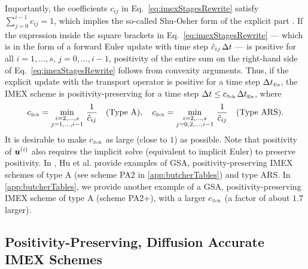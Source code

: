 Importantly, the coefficients $c_{ij}$ in Eq.~\eqref{eq:imexStagesRewrite} satisfy $\sum_{j=0}^{i-1}c_{ij}=1$, which implies the so-called Shu-Osher form of the explicit part \cite{shuOsher_1988}.  
If the expression inside the square brackets in Eq.~\eqref{eq:imexStagesRewrite} --- which is in the form of a forward Euler update with time step $\hat{c}_{ij}\,\Delta t$ --- is positive for all $i=1,\ldots,s$, $j=0,\ldots,i-1$, positivity of the entire sum on the right-hand side of Eq.~\eqref{eq:imexStagesRewrite} follows from convexity arguments.  
Thus, if the explicit update with the transport operator is positive for a time step $\Delta t_{\mbox{\tiny Ex}}$, the IMEX scheme is positivity-preserving for a time step $\Delta t\le c_{\mbox{\tiny Sch}}\,\Delta t_{\mbox{\tiny Ex}}$, where
\begin{equation}
  c_{\mbox{\tiny Sch}}=\min_{\substack{i = 2,\ldots,s \\ 
       j = 1,\ldots,i-1}}\,\frac{1}{\hat{c}_{ij}} \quad \text{(Type A)}, \quad  c_{\mbox{\tiny Sch}}=\min_{\substack{i = 2,\ldots,s \\ 
              j = 0,2,\ldots,i-1}}\,\frac{1}{\hat{c}_{ij}} \quad \text{(Type ARS)}.
  \label{eq:imexCFL}
\end{equation}
It is desirable to make $c_{\mbox{\tiny Sch}}$ as large (close to $1$) as possible.  
Note that positivity of $\boldsymbol{u}^{(i)}$ also requires the implicit solve (equivalent to implicit Euler) to preserve positivity.  
In \cite{hu_etal_2018}, Hu et al. provide examples of GSA, positivity-preserving IMEX schemes of type A (see scheme PA2 in \ref{app:butcherTables}) and type ARS.  
In \ref{app:butcherTables}, we provide another example of a GSA, positivity-preserving IMEX scheme of type A (scheme PA2+), with a larger $c_{\mbox{\tiny Sch}}$ (a factor of about $1.7$ larger).  

\subsection{Positivity-Preserving, Diffusion Accurate IMEX Schemes}

